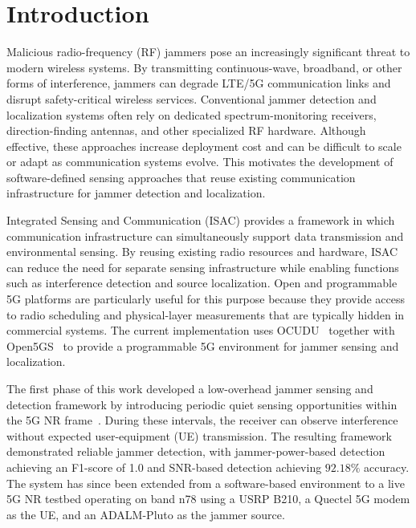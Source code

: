 \documentclass[conference]{IEEEtran}
\begin{document}
\section{Introduction}

Malicious radio-frequency (RF) jammers pose an increasingly significant threat to modern wireless systems. By transmitting continuous-wave, broadband, or other forms of interference, jammers can degrade LTE/5G communication links and disrupt safety-critical wireless services. Conventional jammer detection and localization systems often rely on dedicated spectrum-monitoring receivers, direction-finding antennas, and other specialized RF hardware. Although effective, these approaches increase deployment cost and can be difficult to scale or adapt as communication systems evolve. This motivates the development of software-defined sensing approaches that reuse existing communication infrastructure for jammer detection and localization.

Integrated Sensing and Communication (ISAC) provides a framework in which communication infrastructure can simultaneously support data transmission and environmental sensing. By reusing existing radio resources and hardware, ISAC can reduce the need for separate sensing infrastructure while enabling functions such as interference detection and source localization. Open and programmable 5G platforms are particularly useful for this purpose because they provide access to radio scheduling and physical-layer measurements that are typically hidden in commercial systems. The current implementation uses OCUDU~\cite{ocudu_project} together with Open5GS~\cite{open5gs_site} to provide a programmable 5G environment for jammer sensing and localization.

The first phase of this work developed a low-overhead jammer sensing and detection framework by introducing periodic quiet sensing opportunities within the 5G NR frame~\cite{3gpp38211}. During these intervals, the receiver can observe interference without expected user-equipment (UE) transmission. The resulting framework demonstrated reliable jammer detection, with jammer-power-based detection achieving an F1-score of 1.0 and SNR-based detection achieving $92.18\%$ accuracy. The system has since been extended from a software-based environment to a live 5G NR testbed operating on band n78 using a USRP B210, a Quectel 5G modem as the UE, and an ADALM-Pluto as the jammer source.
\end{document}
